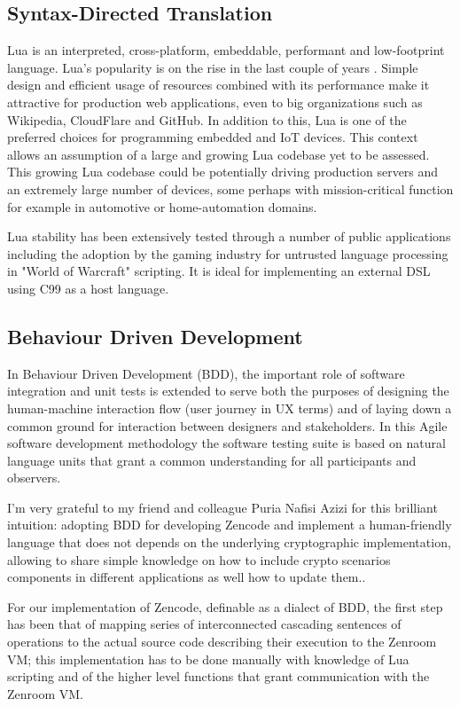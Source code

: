\documentclass{svproc}
\begin{document}
\subsection{Syntax-Directed Translation}

Lua is an interpreted, cross-platform, embeddable, performant and
low-footprint language. Lua's popularity is on the rise in the last
couple of years \cite{costin2017lua}. Simple design and efficient
usage of resources combined with its performance make it attractive
for production web applications, even to big organizations such as
Wikipedia, CloudFlare and GitHub. In addition to this, Lua is one of
the preferred choices for programming embedded and IoT devices. This
context allows an assumption of a large and growing Lua codebase yet
to be assessed. This growing Lua codebase could be potentially driving
production servers and an extremely large number of devices, some
perhaps with mission-critical function for example in automotive or
home-automation domains.

Lua stability has been extensively tested through a number of public
applications including the adoption by the gaming industry for
untrusted language processing in "World of Warcraft" scripting. It is
ideal for implementing an external DSL using C99 as a host language.

\subsection{Behaviour Driven Development}

In Behaviour Driven Development (BDD), the important role of software
integration and unit tests is extended to serve both the purposes of
designing the human-machine interaction flow (user journey in UX
terms) and of laying down a common ground for interaction between
designers and stakeholders. In this Agile software development
methodology the software testing suite is based on natural language
units that grant a common understanding for all participants and
observers.

I'm very grateful to my friend and colleague Puria Nafisi Azizi for
this brilliant intuition: adopting BDD for developing Zencode and
implement a human-friendly language that does not depends on the
underlying cryptographic implementation, allowing to share simple
knowledge on how to include crypto scenarios components in different
applications as well how to update them..

For our implementation of Zencode, definable as a dialect of BDD, the
first step has been that of mapping series of interconnected cascading
sentences of operations to the actual source code describing their
execution to the Zenroom VM; this implementation has to be done
manually with knowledge of Lua scripting and of the higher level
functions that grant communication with the Zenroom VM.
\end{document}
